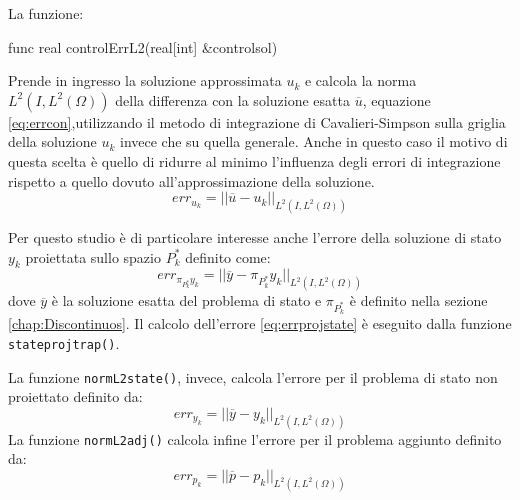 La funzione:
\begin{Code}[caption={Funzione \texttt{controlErrL2}}]
func real controlErrL2(real[int] &controlsol)
\end{Code}
Prende in ingresso la soluzione approssimata $u_k$ e calcola la norma $L^2(I,L^2(\Omega))$ della differenza con la soluzione esatta $\overline{u}$, equazione \eqref{eq:errcon},utilizzando il metodo di integrazione di Cavalieri-Simpson sulla griglia della soluzione $u_k$ invece che su quella generale. Anche in questo caso il motivo di questa scelta è quello di ridurre al minimo l'influenza degli errori di integrazione rispetto a quello dovuto all'approssimazione della soluzione.
\begin{equation}
err_{u_k} = || \overline{u} - u_k ||_{L^2(I,L^2(\Omega))}
\label{eq:errcon}
\end{equation}
\par
Per questo studio è di particolare interesse anche l'errore della soluzione di stato $y_k$ proiettata sullo spazio $P^*_k$ definito come:
\begin{equation}
err_{\pi_{P^*_k}y_k} = || \overline{y} - \pi_{P^*_k}y_k ||_{L^2(I,L^2(\Omega))}
\label{eq:errprojstate}
\end{equation}
dove $\overline{y}$ è la soluzione esatta del problema di stato e $\pi_{P^*_k}$ è definito nella sezione \ref{chap:Discontinuos}.
Il calcolo dell'errore \eqref{eq:errprojstate} è eseguito dalla funzione \texttt{stateprojtrap()}.
\par
La funzione \texttt{normL2state()}, invece, calcola l'errore per il problema di stato non proiettato definito da:
\begin{equation}
err_{y_k} = || \overline{y} - y_k ||_{L^2(I,L^2(\Omega))}
\label{eq:errstate}
\end{equation}
La funzione \texttt{normL2adj()} calcola infine l'errore per il problema aggiunto definito da:
\begin{equation}
err_{p_k} = || \overline{p} - p_k ||_{L^2(I,L^2(\Omega))}
\label{eq:erradj}
\end{equation}

